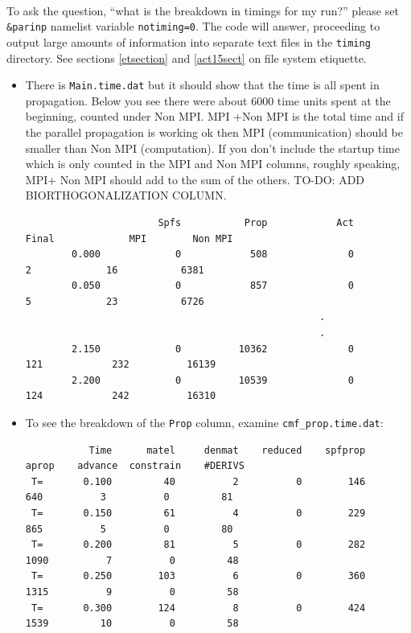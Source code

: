 \documentclass[10pt,leqno, oneside]{book}
\begin{document}
\

To ask the question, ``what is the breakdown in timings for my run?'' please set \verb#&parinp# namelist variable \verb#notiming=0#.
The code will answer, proceeding to output large amounts of information into separate text files in the
\verb#timing# directory.  See sections \ref{etsection} and \ref{act15sect} on file system etiquette.


\begin{itemize}
%
\item{There is \verb#Main.time.dat# but it should show that the time is all spent
in propagation.  Below you see there were about 6000 time units spent at the beginning, counted under Non MPI.
MPI +Non MPI is the total time and if the parallel propagation is working ok then MPI (communication) should be smaller
than Non MPI (computation).  If you don't include the startup time which is only counted in the MPI and Non MPI columns,
roughly speaking,
MPI+ Non MPI should add to the sum of the others.  TO-DO: ADD BIORTHOGONALIZATION COLUMN.
%
{\footnotesize
\begin{verbatim}
                       Spfs           Prop            Act          Final             MPI        Non MPI
        0.000             0            508              0              2             16           6381
        0.050             0            857              0              5             23           6726
                                                   .
                                                   .
        2.150             0          10362              0            121            232          16139
        2.200             0          10539              0            124            242          16310
\end{verbatim}}       
}
%
\item{To see the breakdown of the \verb#Prop# column, examine \verb#cmf_prop.time.dat#:
{\footnotesize
\begin{verbatim}
           Time      matel     denmat    reduced    spfprop      aprop    advance  constrain    #DERIVS
 T=       0.100         40          2          0        146        640          3          0         81
 T=       0.150         61          4          0        229        865          5          0         80
 T=       0.200         81          5          0        282       1090          7          0         48
 T=       0.250        103          6          0        360       1315          9          0         58
 T=       0.300        124          8          0        424       1539         10          0         58

\end{verbatim}}}
\end{itemize}
\end{document}
